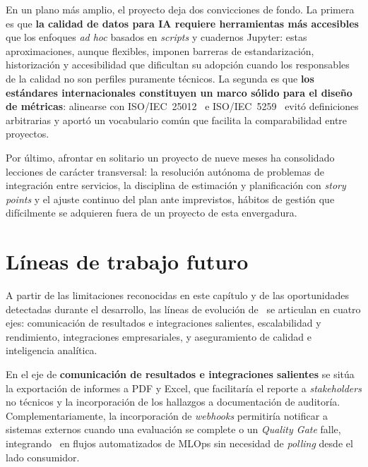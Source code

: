 En un plano más amplio, el proyecto deja dos convicciones de fondo.  La
primera es que \textbf{la calidad de datos para \ac{IA} requiere
herramientas más accesibles} que los enfoques \emph{ad hoc} basados en
\emph{scripts} y cuadernos Jupyter: estas aproximaciones, aunque
flexibles, imponen barreras de estandarización, historización y
accesibilidad que dificultan su adopción cuando los responsables de la
calidad no son perfiles puramente técnicos.  La segunda es que \textbf{los
estándares internacionales constituyen un marco sólido para el diseño de
métricas}: alinearse con \ac{ISO}/\ac{IEC}~25012~\citep{iso25012} e
\ac{ISO}/\ac{IEC}~5259~\citep{iso5259} evitó definiciones arbitrarias y
aportó un vocabulario común que facilita la comparabilidad entre proyectos.

Por último, afrontar en solitario un proyecto de nueve meses ha
consolidado lecciones de carácter transversal: la resolución autónoma de
problemas de integración entre servicios, la disciplina de estimación y
planificación con \emph{story points} y el ajuste continuo del plan ante
imprevistos, hábitos de gestión que difícilmente se adquieren fuera de un
proyecto de esta envergadura.


\section{Líneas de trabajo futuro}
\label{sec:trabajo-futuro}

A partir de las limitaciones reconocidas en este capítulo y de las
oportunidades detectadas durante
el desarrollo, las líneas de evolución de \dataqual\ se articulan en
cuatro ejes: comunicación de resultados e integraciones salientes,
escalabilidad y rendimiento, integraciones empresariales, y
aseguramiento de calidad e inteligencia analítica.

En el eje de \textbf{comunicación de resultados e integraciones
salientes} se sitúa la exportación de informes a \ac{PDF} y Excel, que
facilitaría el reporte a \emph{stakeholders} no técnicos y la
incorporación de los hallazgos a documentación de auditoría.
Complementariamente, la incorporación de \emph{webhooks} permitiría
notificar a sistemas externos cuando una evaluación se complete o un
\emph{Quality Gate} falle, integrando \dataqual\ en flujos automatizados
de \ac{MLOps} sin necesidad de \emph{polling} desde el lado consumidor.

